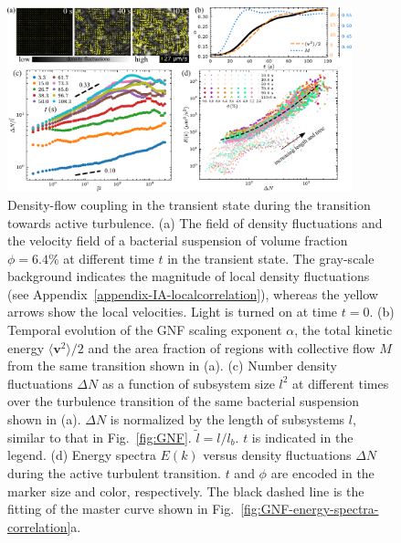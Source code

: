 \documentclass[twocolumn,aps,prx,amsmath,amssymb,longbibliography,superscriptaddress]{revtex4-2}
\begin{document}
\begin{figure}[t]
\begin{center}
\includegraphics[width=0.89\textwidth]{Figures/fig-6.pdf}
\caption[The correlation between GNF and kinetic energy and kinetic energy spectra at transient state]
{
Density-flow coupling in the transient state during the transition towards active turbulence.
(a) The field of density fluctuations and the velocity field of a bacterial suspension of volume fraction $\phi=6.4\%$ at different time $t$ in the transient state. The gray-scale background indicates the magnitude of local density fluctuations (see Appendix~\ref{appendix-IA-localcorrelation}), whereas the yellow arrows show the local velocities. Light is turned on at time $t = 0$.
(b) Temporal evolution of the GNF scaling exponent $\alpha$, the total kinetic energy $\langle \bm{v}^2 \rangle/2$ and the area fraction of regions with collective flow $M$ from the same transition shown in (a).
(c) Number density fluctuations $\Delta N$ as a function of subsystem size $l^2$ at different times over the turbulence transition of the same bacterial suspension shown in (a). $\Delta N$ is normalized by the length of subsystems $l$, similar to that in Fig.~\ref{fig:GNF}. $\tilde{l} = l/l_b$. $t$ is indicated in the legend.
(d) Energy spectra $E(k)$ versus density fluctuations $\Delta N$ during the active turbulent transition. $t$ and $\phi$ are encoded in the marker size and color, respectively. The black dashed line is the fitting of the master curve shown in Fig.~\ref{fig:GNF-energy-spectra-correlation}a.
}
\label{fig:GNF-energy-spectra-correlation-transient}
\end{center}
\end{figure}
\end{document}
